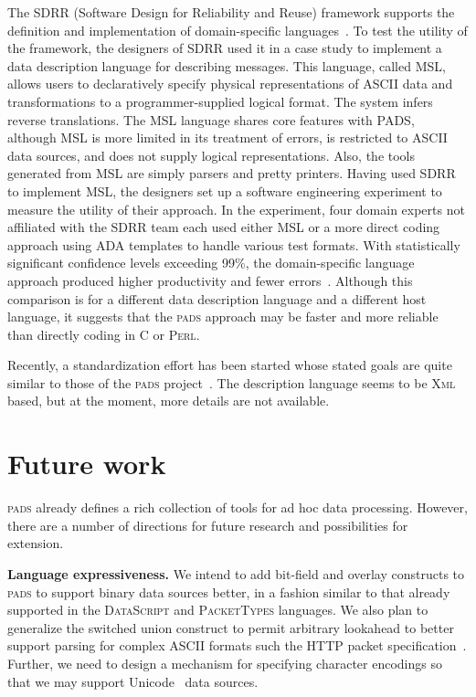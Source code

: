 \documentclass{sigplanconf}
\newcommand{\pads}{\textsc{pads}}
\newcommand{\C}{\textsc{C}}
\newcommand{\perl}{\textsc{Perl}}
\newcommand{\xml}{\textsc{Xml}}
\newcommand{\datascript}{\textsc{DataScript}}
\newcommand{\packettypes}{\textsc{PacketTypes}}
\begin{document}
The SDRR (Software Design for Reliability and Reuse) framework supports the definition and implementation of domain-specific languages~\cite{msl}.  To test the utility of the framework, the designers of SDRR used it in a case study to implement a data description language for describing messages.  This language, called MSL, allows users to declaratively specify physical representations of ASCII data and transformations to a programmer-supplied logical format.  The system infers reverse translations.  The MSL language shares core features with PADS, although MSL is more limited in its treatment of errors, is restricted to ASCII data sources, and does not supply logical representations.  Also, the tools generated from MSL are simply parsers and pretty printers.   Having used SDRR to implement MSL, the designers set up a software engineering experiment to measure the utility of their approach.  In the experiment, four domain experts not affiliated with the SDRR team each used either MSL or a more direct coding approach using ADA templates to handle various test formats.  With statistically significant confidence levels exceeding 99\%, the domain-specific language approach produced higher productivity and fewer errors~\cite{sddr}.  Although this comparison is for a different data description language and a different host language, it suggests that the \pads{} approach may be faster and more reliable than directly coding in \C{} or \perl{}.

Recently, a standardization effort has been started whose stated goals are quite similar to those of the \pads{} project~\cite{dfdl}. The description
language seems to be \xml{} based, but at the moment, more details are 
not available.

\section{Future work}
\pads{} already defines a rich collection of tools for ad hoc data processing.
However, there are a number of directions for future research and possibilities for extension. 

\textbf{Language expressiveness.}  
We intend to add bit-field 
and overlay constructs to \pads{} to support binary data sources better,
in a fashion similar to that already supported in the \datascript{} and \packettypes{} languages.
We also plan to generalize the switched union construct to permit arbitrary lookahead to better support
parsing for complex ASCII formats such the HTTP packet specification~\cite{http}.  Further, we need to design a mechanism
for specifying character encodings so that we may support 
Unicode~\cite{unicode} data sources.
\end{document}
